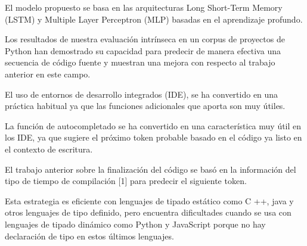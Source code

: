 El modelo propuesto se basa en las arquitecturas 
Long Short-Term Memory (LSTM) y Multiple Layer Perceptron (MLP) 
basadas en el aprendizaje profundo. 

Los resultados de nuestra evaluación 
intrínseca en un corpus de proyectos de Python 
han demostrado su capacidad para predecir de manera efectiva 
una secuencia de código fuente 
y muestran una mejora con respecto al trabajo anterior en este campo.




El uso de entornos de desarrollo integrados (IDE), 
se ha convertido en una práctica habitual ya que 
las funciones adicionales que aporta son muy útiles. 

La función de autocompletado 
se ha convertido en una característica muy útil en los IDE, 
ya que sugiere el próximo token probable basado en el código 
ya listo en el contexto de escritura. 

El trabajo anterior sobre la finalización del código 
se basó en la información del tipo de tiempo de compilación [1] 
para predecir el siguiente token. 

Esta estrategia es eficiente con lenguajes de tipado estático 
como C ++, java y otros lenguajes de tipo definido, 
pero encuentra dificultades cuando se usa con lenguajes de tipado dinámico 
como Python y JavaScript porque no hay declaración de tipo en estos últimos lenguajes. 




